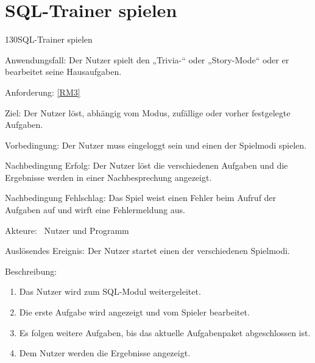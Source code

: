 \section{SQL-Trainer spielen}
\begin{function}{130}{SQL-Trainer spielen}
\item[Anwendungsfall:] Der Nutzer spielt den „Trivia-“ oder „Story-Mode“ oder er bearbeitet seine Hausaufgaben.
\item[Anforderung:] \ref{RM3}
\item[Ziel:] Der Nutzer löst, abhängig vom Modus, zufällige oder vorher festgelegte Aufgaben.
\item[Vorbedingung:] Der Nutzer muss eingeloggt sein und einen der Spielmodi spielen.
\item[Nachbedingung Erfolg:]  Der Nutzer löst die verschiedenen Aufgaben und die Ergebnisse werden in einer Nachbesprechung angezeigt.
\item[Nachbedingung Fehlschlag:] Das Spiel weist einen Fehler beim Aufruf der Aufgaben auf und wirft eine Fehlermeldung aus.
\item[Akteure:] ~Nutzer und Programm
\item[Auslösendes Ereignis:] Der Nutzer startet einen der verschiedenen Spielmodi.
\item[Beschreibung:] ~
\begin{enumerate}
  \item  Das Nutzer wird zum SQL-Modul weitergeleitet.
  \item  Die erste Aufgabe wird angezeigt und vom Spieler bearbeitet.
  \item Es folgen weitere Aufgaben, bis das aktuelle Aufgabenpaket abgeschlossen ist.
  \item Dem Nutzer werden die Ergebnisse angezeigt.
\end{enumerate}
\end{function}

